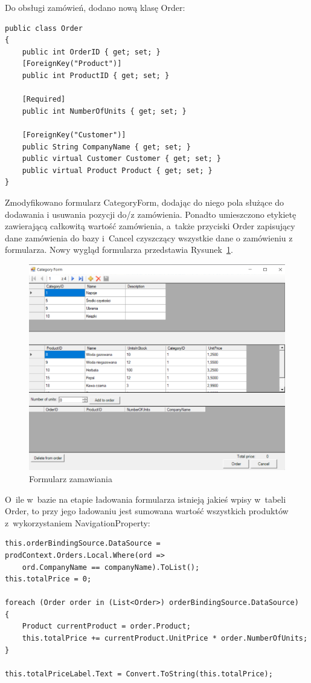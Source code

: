 \documentclass[12pt, a4paper]{mwart}
\begin{document}
Do obsługi zamówień, dodano nową klasę Order:
\begin{lstlisting}
public class Order
{
	public int OrderID { get; set; }
	[ForeignKey("Product")]
	public int ProductID { get; set; }

	[Required]
	public int NumberOfUnits { get; set; }

	[ForeignKey("Customer")]
	public String CompanyName { get; set; }
	public virtual Customer Customer { get; set; }
	public virtual Product Product { get; set; }
}
\end{lstlisting}

Zmodyfikowano formularz CategoryForm, dodając do niego pola służące do dodawania i usuwania pozycji do/z zamówienia. Ponadto umieszczono etykietę zawierającą całkowitą wartość zamówienia, a~także przyciski Order \ppauza zapisujący dane zamówienia do bazy i~Cancel \ppauza czyszczący wszystkie dane o zamówieniu z formularza. Nowy wygląd formularza przedstawia Rysunek~\ref{rys:6.2}.

\begin{figure}[ht]
  \centering
  \includegraphics[scale=0.5]{VI/6-2.png}
  \caption{Formularz zamawiania}
  \label{rys:6.2}
\end{figure}

O~ile w~bazie na etapie ładowania formularza istnieją jakieś wpisy w~tabeli Order, to przy jego ładowaniu jest sumowana wartość wszystkich produktów z~wykorzystaniem NavigationProperty:

\begin{lstlisting}
this.orderBindingSource.DataSource = prodContext.Orders.Local.Where(ord => 
	ord.CompanyName == companyName).ToList();
this.totalPrice = 0;

foreach (Order order in (List<Order>) orderBindingSource.DataSource)
{
	Product currentProduct = order.Product;
	this.totalPrice += currentProduct.UnitPrice * order.NumberOfUnits;
}

this.totalPriceLabel.Text = Convert.ToString(this.totalPrice);
\end{lstlisting}
\end{document}
